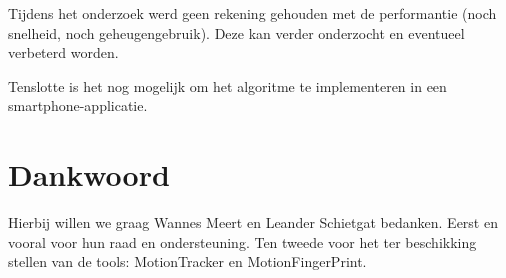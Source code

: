 \documentclass{article}
\begin{document}
Tijdens het onderzoek werd geen rekening gehouden met de performantie (noch snelheid, noch geheugengebruik). Deze kan verder onderzocht en eventueel verbeterd worden.

	


Tenslotte is het nog mogelijk om het algoritme te implementeren in een smartphone-applicatie.

\section{Dankwoord}

Hierbij willen we graag Wannes Meert en Leander Schietgat bedanken. Eerst en vooral voor hun raad en ondersteuning. Ten tweede voor het ter beschikking stellen van de tools: MotionTracker en MotionFingerPrint.




\end{document}
